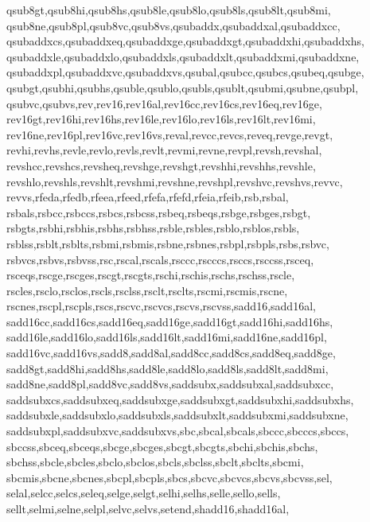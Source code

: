 {{      qsub8gt,qsub8hi,qsub8hs,qsub8le,qsub8lo,qsub8ls,qsub8lt,qsub8mi,        %
      qsub8ne,qsub8pl,qsub8vc,qsub8vs,qsubaddx,qsubaddxal,qsubaddxcc,         %
      qsubaddxcs,qsubaddxeq,qsubaddxge,qsubaddxgt,qsubaddxhi,qsubaddxhs,      %
      qsubaddxle,qsubaddxlo,qsubaddxls,qsubaddxlt,qsubaddxmi,qsubaddxne,      %
      qsubaddxpl,qsubaddxvc,qsubaddxvs,qsubal,qsubcc,qsubcs,qsubeq,qsubge,    %
      qsubgt,qsubhi,qsubhs,qsuble,qsublo,qsubls,qsublt,qsubmi,qsubne,qsubpl,  %
      qsubvc,qsubvs,rev,rev16,rev16al,rev16cc,rev16cs,rev16eq,rev16ge,        %
      rev16gt,rev16hi,rev16hs,rev16le,rev16lo,rev16ls,rev16lt,rev16mi,        %
      rev16ne,rev16pl,rev16vc,rev16vs,reval,revcc,revcs,reveq,revge,revgt,    %
      revhi,revhs,revle,revlo,revls,revlt,revmi,revne,revpl,revsh,revshal,    %
      revshcc,revshcs,revsheq,revshge,revshgt,revshhi,revshhs,revshle,        %
      revshlo,revshls,revshlt,revshmi,revshne,revshpl,revshvc,revshvs,revvc,  %
      revvs,rfeda,rfedb,rfeea,rfeed,rfefa,rfefd,rfeia,rfeib,rsb,rsbal,        %
      rsbals,rsbcc,rsbccs,rsbcs,rsbcss,rsbeq,rsbeqs,rsbge,rsbges,rsbgt,       %
      rsbgts,rsbhi,rsbhis,rsbhs,rsbhss,rsble,rsbles,rsblo,rsblos,rsbls,       %
      rsblss,rsblt,rsblts,rsbmi,rsbmis,rsbne,rsbnes,rsbpl,rsbpls,rsbs,rsbvc,  %
      rsbvcs,rsbvs,rsbvss,rsc,rscal,rscals,rsccc,rscccs,rsccs,rsccss,rsceq,   %
      rsceqs,rscge,rscges,rscgt,rscgts,rschi,rschis,rschs,rschss,rscle,       %
      rscles,rsclo,rsclos,rscls,rsclss,rsclt,rsclts,rscmi,rscmis,rscne,       %
      rscnes,rscpl,rscpls,rscs,rscvc,rscvcs,rscvs,rscvss,sadd16,sadd16al,     %
      sadd16cc,sadd16cs,sadd16eq,sadd16ge,sadd16gt,sadd16hi,sadd16hs,         %
      sadd16le,sadd16lo,sadd16ls,sadd16lt,sadd16mi,sadd16ne,sadd16pl,         %
      sadd16vc,sadd16vs,sadd8,sadd8al,sadd8cc,sadd8cs,sadd8eq,sadd8ge,        %
      sadd8gt,sadd8hi,sadd8hs,sadd8le,sadd8lo,sadd8ls,sadd8lt,sadd8mi,        %
      sadd8ne,sadd8pl,sadd8vc,sadd8vs,saddsubx,saddsubxal,saddsubxcc,         %
      saddsubxcs,saddsubxeq,saddsubxge,saddsubxgt,saddsubxhi,saddsubxhs,      %
      saddsubxle,saddsubxlo,saddsubxls,saddsubxlt,saddsubxmi,saddsubxne,      %
      saddsubxpl,saddsubxvc,saddsubxvs,sbc,sbcal,sbcals,sbccc,sbcccs,sbccs,   %
      sbccss,sbceq,sbceqs,sbcge,sbcges,sbcgt,sbcgts,sbchi,sbchis,sbchs,       %
      sbchss,sbcle,sbcles,sbclo,sbclos,sbcls,sbclss,sbclt,sbclts,sbcmi,       %
      sbcmis,sbcne,sbcnes,sbcpl,sbcpls,sbcs,sbcvc,sbcvcs,sbcvs,sbcvss,sel,    %
      selal,selcc,selcs,seleq,selge,selgt,selhi,selhs,selle,sello,sells,      %
      sellt,selmi,selne,selpl,selvc,selvs,setend,shadd16,shadd16al,           %
}}
